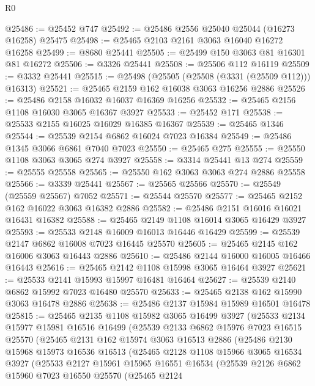 \begin{lexlean}{R0}
\begin{coremodule}
@25486 := @25452 @747
@25492 := @25486 @2556 @25040 @25044 (@16273 @16258) @25475
@25498 := @25465 @2103 @2161 @3063 @16040 @16272 @16258
@25499 := @8680 @25441
@25505 := @25499 @150 @3063 @81 @16301 @81 @16272
@25506 := @3326 @25441
@25508 := @25506 @112 @16119
@25509 := @3332 @25441
@25515 := @25498 (@25505 (@25508 (@3331 (@25509 @112))) @16313)
@25521 := @25465 @2159 @162 @16038 @3063 @16256 @2886
@25526 := @25486 @2158 @16032 @16037 @16369 @16256
@25532 := @25465 @2156 @1108 @16030 @3065 @16367 @3927
@25533 := @25452 @171
@25538 := @25533 @2155 @16025 @16029 @16385 @16367
@25539 := @25465 @1346
@25544 := @25539 @2154 @6862 @16024 @7023 @16384
@25549 := @25486 @1345 @3066 @6861 @7040 @7023
@25550 := @25465 @275
@25555 := @25550 @1108 @3063 @3065 @274 @3927
@25558 := @3314 @25441 @13 @274
@25559 := @25555 @25558
@25565 := @25550 @162 @3063 @3063 @274 @2886 @25558
@25566 := @3339 @25441
@25567 := @25565 @25566
@25570 := @25549 (@25559 @25567) @7052
@25571 := @25544 @25570
@25577 := @25465 @2152 @162 @16022 @3063 @16382 @2886
@25582 := @25486 @2151 @16016 @16021 @16431 @16382
@25588 := @25465 @2149 @1108 @16014 @3065 @16429 @3927
@25593 := @25533 @2148 @16009 @16013 @16446 @16429
@25599 := @25539 @2147 @6862 @16008 @7023 @16445 @25570
@25605 := @25465 @2145 @162 @16006 @3063 @16443 @2886
@25610 := @25486 @2144 @16000 @16005 @16466 @16443
@25616 := @25465 @2142 @1108 @15998 @3065 @16464 @3927
@25621 := @25533 @2141 @15993 @15997 @16481 @16464
@25627 := @25539 @2140 @6862 @15992 @7023 @16480 @25570
@25633 := @25465 @2138 @162 @15990 @3063 @16478 @2886
@25638 := @25486 @2137 @15984 @15989 @16501 @16478
@25815 := @25465
    @2135
    @1108
    @15982
    @3065
    @16499
    @3927
    (@25533
      @2134
      @15977
      @15981
      @16516
      @16499
      (@25539
        @2133
        @6862
        @15976
        @7023
        @16515
        @25570
        (@25465
          @2131
          @162
          @15974
          @3063
          @16513
          @2886
          (@25486
            @2130
            @15968
            @15973
            @16536
            @16513
            (@25465
              @2128
              @1108
              @15966
              @3065
              @16534
              @3927
              (@25533
                @2127
                @15961
                @15965
                @16551
                @16534
                (@25539
                  @2126
                  @6862
                  @15960
                  @7023
                  @16550
                  @25570
                  (@25465
                    @2124

\end{coremodule}
\end{lexlean}
